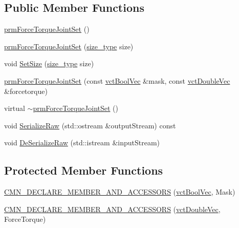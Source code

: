\subsection*{Public Member Functions}
\begin{DoxyCompactItemize}
\item 
\hyperlink{classprm_force_torque_joint_set_a5e9a84c3f2e5e0c7abc321248c3de996}{prm\-Force\-Torque\-Joint\-Set} ()
\item 
\hyperlink{classprm_force_torque_joint_set_acd4d7a0698ff15285a7c47d84cfd804e}{prm\-Force\-Torque\-Joint\-Set} (\hyperlink{classprm_force_torque_joint_set_a2fa9d363f410074de832a3f627f3b43b}{size\-\_\-type} size)
\item 
void \hyperlink{classprm_force_torque_joint_set_ac8951e030adcaafe6c9d80c4ac87d8da}{Set\-Size} (\hyperlink{classprm_force_torque_joint_set_a2fa9d363f410074de832a3f627f3b43b}{size\-\_\-type} size)
\item 
\hyperlink{classprm_force_torque_joint_set_a164f68c9bb4893fd48fa181cf3aa2e27}{prm\-Force\-Torque\-Joint\-Set} (const \hyperlink{vct_dynamic_vector_types_8h_aeb2237c134aee3769198bd9d55c8a9e0}{vct\-Bool\-Vec} \&mask, const \hyperlink{vct_dynamic_vector_types_8h_ade4b3068c86fb88f41af2e5187e491c2}{vct\-Double\-Vec} \&forcetorque)
\item 
virtual \hyperlink{classprm_force_torque_joint_set_a597372c5d1426778754af6353a36f5bd}{$\sim$prm\-Force\-Torque\-Joint\-Set} ()
\item 
void \hyperlink{classprm_force_torque_joint_set_a069781a484227e6de0465c2819e2d71b}{Serialize\-Raw} (std\-::ostream \&output\-Stream) const 
\item 
void \hyperlink{classprm_force_torque_joint_set_a1ca3cebb65848ed8cadb5117e621696b}{De\-Serialize\-Raw} (std\-::istream \&input\-Stream)
\end{DoxyCompactItemize}
\subsection*{Protected Member Functions}
\begin{DoxyCompactItemize}
\item 
\hyperlink{classprm_force_torque_joint_set_aaaeacc972d59d1c77264997e5da17d7b}{C\-M\-N\-\_\-\-D\-E\-C\-L\-A\-R\-E\-\_\-\-M\-E\-M\-B\-E\-R\-\_\-\-A\-N\-D\-\_\-\-A\-C\-C\-E\-S\-S\-O\-R\-S} (\hyperlink{vct_dynamic_vector_types_8h_aeb2237c134aee3769198bd9d55c8a9e0}{vct\-Bool\-Vec}, Mask)
\item 
\hyperlink{classprm_force_torque_joint_set_ad108954efb68dd57363d6a149de33f68}{C\-M\-N\-\_\-\-D\-E\-C\-L\-A\-R\-E\-\_\-\-M\-E\-M\-B\-E\-R\-\_\-\-A\-N\-D\-\_\-\-A\-C\-C\-E\-S\-S\-O\-R\-S} (\hyperlink{vct_dynamic_vector_types_8h_ade4b3068c86fb88f41af2e5187e491c2}{vct\-Double\-Vec}, Force\-Torque)
\end{DoxyCompactItemize}


